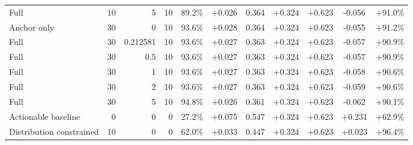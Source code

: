 \begin{table}[htbp]
\begin{tabular}{lrrrccccccc}
Full & 10 & 5 & 10 & 89.2\% & +0.026 & 0.364 & +0.324 & +0.623 & -0.056 & +91.0\% \\
Anchor only & 30 & 0 & 10 & 93.6\% & +0.028 & 0.364 & +0.324 & +0.623 & -0.055 & +91.2\% \\
Full & 30 & 0.212581 & 10 & 93.6\% & +0.027 & 0.363 & +0.324 & +0.623 & -0.057 & +90.9\% \\
Full & 30 & 0.5 & 10 & 93.6\% & +0.027 & 0.363 & +0.324 & +0.623 & -0.057 & +90.9\% \\
Full & 30 & 1 & 10 & 93.6\% & +0.027 & 0.363 & +0.324 & +0.623 & -0.058 & +90.6\% \\
Full & 30 & 2 & 10 & 93.6\% & +0.027 & 0.363 & +0.324 & +0.623 & -0.059 & +90.6\% \\
Full & 30 & 5 & 10 & 94.8\% & +0.026 & 0.361 & +0.324 & +0.623 & -0.062 & +90.1\% \\
Actionable baseline & 0 & 0 & 0 & 27.2\% & +0.075 & 0.547 & +0.324 & +0.623 & +0.231 & +62.9\% \\
Distribution constrained & 10 & 0 & 0 & 62.0\% & +0.033 & 0.447 & +0.324 & +0.623 & +0.023 & +96.4\% \\
\bottomrule
\end{tabular}
\end{table}